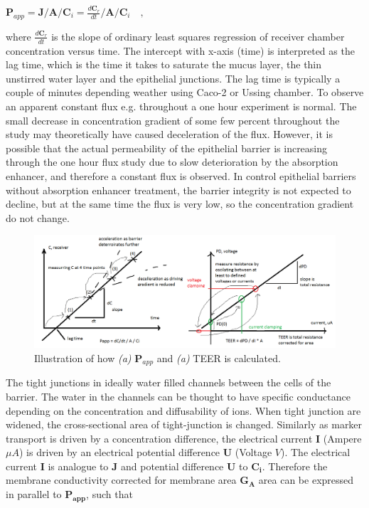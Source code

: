 $\bm{P}_{app} = \bm{J} / \bm{A} / \bm{C}_i = \frac{d\bm{C}_r}{dt} / \bm{A} / \bm{C}_i \quad ,$

where $\frac{d\bm{C}_r}{dt}$ is the slope of ordinary least squares regression of receiver chamber concentration versus time. The intercept with x-axis (time) is interpreted as the lag time, which is the time it takes to saturate the mucus layer, the thin unstirred water layer and the epithelial junctions. The lag time is typically a couple of minutes depending weather using Caco-2 or Ussing chamber. To observe an apparent constant flux e.g. throughout a one hour experiment is normal. The small decrease in concentration gradient of some few percent throughout the study may theoretically have caused deceleration of the flux. However, it is possible that the actual permeability of the epithelial barrier is increasing through the one hour flux study due to slow deterioration by the absorption enhancer, and therefore a constant flux is observed. In control epithelial barriers without absorption enhancer treatment, the barrier integrity is not expected to decline, but at the same time the flux is very low, so the concentration gradient do not change.

\begin{figure}[!htpb]
\includegraphics[width=\textwidth,height=\textheight,keepaspectratio]{graphics/sketch_measuring_permeability.png}
\caption{Illustration of how \textit{(a)} $\bm{P}_{app}$ and \textit{(a)}  TEER is calculated.}
\label{meassure_TEERPapp}
\end{figure}

The tight junctions in ideally water filled channels between the cells of the barrier. The water in the channels can be thought to have specific conductance depending on the concentration and diffusability of ions. When tight junction are widened, the cross-sectional area of tight-junction is changed. Similarly as marker transport is driven by a concentration difference, the electrical current $\bm{I}$ (Ampere $\mu A$) is driven by an electrical potential difference $\bm{U}$ (Voltage $V$). The electrical current $\bm{I}$ is analogue to $\bm{J}$ and potential difference $\bm{U}$ to $\bm{C_i}$. Therefore the membrane conductivity corrected for membrane area $\bm{G_A}$ area can be expressed in parallel to $\bm{P_{app}}$, such that

